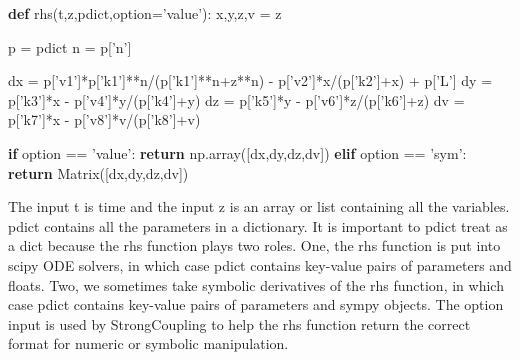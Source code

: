 \documentclass[english,a4paper,oneside]{article}
\newenvironment{Shaded}{}{}
\newcommand{\KeywordTok}[1]{\textcolor[rgb]{0.00,0.44,0.13}{\textbf{#1}}}
\newcommand{\StringTok}[1]{\textcolor[rgb]{0.25,0.44,0.63}{#1}}
\newcommand{\ControlFlowTok}[1]{\textcolor[rgb]{0.00,0.44,0.13}{\textbf{#1}}}
\newcommand{\OperatorTok}[1]{\textcolor[rgb]{0.40,0.40,0.40}{#1}}
\newcommand{\NormalTok}[1]{#1}
\begin{document}
\begin{Shaded}
\begin{Highlighting}[]
\KeywordTok{def}\NormalTok{ rhs(t,z,pdict,option}\OperatorTok{=}\StringTok{'value'}\NormalTok{):}
\NormalTok{    x,y,z,v }\OperatorTok{=}\NormalTok{ z}
    
\NormalTok{    p }\OperatorTok{=}\NormalTok{ pdict}
\NormalTok{    n }\OperatorTok{=}\NormalTok{ p[}\StringTok{'n'}\NormalTok{]}
    
\NormalTok{    dx }\OperatorTok{=}\NormalTok{ p[}\StringTok{'v1'}\NormalTok{]}\OperatorTok{*}\NormalTok{p[}\StringTok{'k1'}\NormalTok{]}\OperatorTok{**}\NormalTok{n}\OperatorTok{/}\NormalTok{(p[}\StringTok{'k1'}\NormalTok{]}\OperatorTok{**}\NormalTok{n}\OperatorTok{+}\NormalTok{z}\OperatorTok{**}\NormalTok{n) }\OperatorTok{-}\NormalTok{ p[}\StringTok{'v2'}\NormalTok{]}\OperatorTok{*}\NormalTok{x}\OperatorTok{/}\NormalTok{(p[}\StringTok{'k2'}\NormalTok{]}\OperatorTok{+}\NormalTok{x) }\OperatorTok{+}\NormalTok{ p[}\StringTok{'L'}\NormalTok{]}
\NormalTok{    dy }\OperatorTok{=}\NormalTok{ p[}\StringTok{'k3'}\NormalTok{]}\OperatorTok{*}\NormalTok{x }\OperatorTok{-}\NormalTok{ p[}\StringTok{'v4'}\NormalTok{]}\OperatorTok{*}\NormalTok{y}\OperatorTok{/}\NormalTok{(p[}\StringTok{'k4'}\NormalTok{]}\OperatorTok{+}\NormalTok{y)}
\NormalTok{    dz }\OperatorTok{=}\NormalTok{ p[}\StringTok{'k5'}\NormalTok{]}\OperatorTok{*}\NormalTok{y }\OperatorTok{-}\NormalTok{ p[}\StringTok{'v6'}\NormalTok{]}\OperatorTok{*}\NormalTok{z}\OperatorTok{/}\NormalTok{(p[}\StringTok{'k6'}\NormalTok{]}\OperatorTok{+}\NormalTok{z)}
\NormalTok{    dv }\OperatorTok{=}\NormalTok{ p[}\StringTok{'k7'}\NormalTok{]}\OperatorTok{*}\NormalTok{x }\OperatorTok{-}\NormalTok{ p[}\StringTok{'v8'}\NormalTok{]}\OperatorTok{*}\NormalTok{v}\OperatorTok{/}\NormalTok{(p[}\StringTok{'k8'}\NormalTok{]}\OperatorTok{+}\NormalTok{v)}
    
    \ControlFlowTok{if}\NormalTok{ option }\OperatorTok{==} \StringTok{'value'}\NormalTok{:}
        \ControlFlowTok{return}\NormalTok{ np.array([dx,dy,dz,dv])}
    \ControlFlowTok{elif}\NormalTok{ option }\OperatorTok{==} \StringTok{'sym'}\NormalTok{:}
        \ControlFlowTok{return}\NormalTok{ Matrix([dx,dy,dz,dv])}
\end{Highlighting}
\end{Shaded}

The input t is time and the input z is an array or list containing all
the variables. pdict contains all the parameters in a dictionary. It is
important to pdict treat as a dict because the rhs function plays two
roles. One, the rhs function is put into scipy ODE solvers, in which
case pdict contains key-value pairs of parameters and floats. Two, we
sometimes take symbolic derivatives of the rhs function, in which case
pdict contains key-value pairs of parameters and sympy objects. The
option input is used by StrongCoupling to help the rhs function return
the correct format for numeric or symbolic manipulation.
\end{document}
